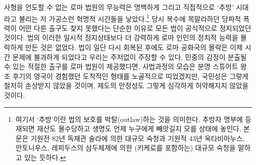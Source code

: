 사형을 언도할 수 없는 로마 법원의 무능력은
명백하게 그리고 직접적으로
`추방' 시대라고 불리는
저 가공스런 혁명적 시간들을 낳았다.\footnote{%
  여기서 `추방'이란 법의 보호를 박탈(outlaw)하는 것을 의미한다.
  추방자 명부에 등재되면 재산도 몰수당하고 생명도 언제 누구에게 빼앗길지
  모를 상태에 놓인다.
  본문은 기원전 82년 독재관 술라에 의한 대규모 숙청과
  기원적 43년 옥타비아누스, 안토니우스, 레피두스의 삼두체제에 의한
  (키케로를 포함하는) 대규모 숙청을 말하고 있는 듯하다. }
당시
복수에 목말라하던
당파적 폭력이
어떤 다른 출구도 찾지 못했다는 단순한 이유로
모든 법이 공식적으로 정지되었던 것이다.
법의 이러한 일시적 정지상태보다 더 강력하게
로마 인민의 정치적 능력을 몰락하게 만든 것은 없었다.
법이 일단 다시 회복된 후에도
로마 공화국의 몰락은 이제 시간 문제에 불과하게 되었다고
우리는 주저없이 주장할 수 있다.
민중의 감정이 분출될 수 있는 적절한 출구를
로마 법원이
제공했다면,
사법과정의 모습은 분명
스튜어트 왕조 후기의 영국이 경험했던
도착적인 형태를 노골적으로 띠었겠지만,
국민성은 그렇게 철저히 손상받지 않았을 것이며,
제도의 안정성도 그렇게 심각하게 허약해지지 않았을 것이다.

